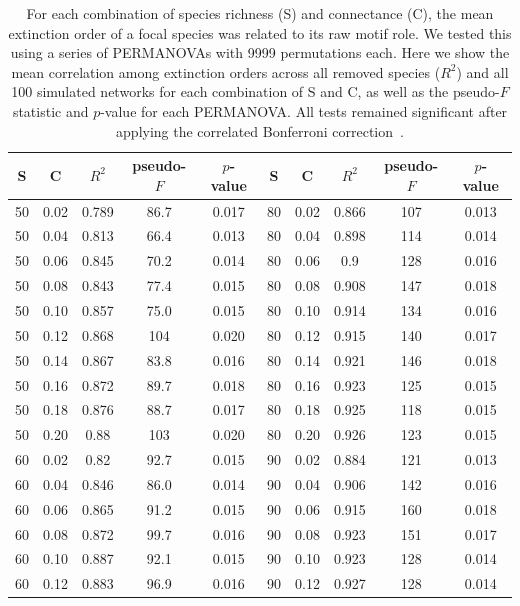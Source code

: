 \documentclass[12pt]{article}
\begin{document}
	\begin{table}[h!]
		\caption{For each combination of species richness (S) and connectance (C), the mean extinction order of a focal species was related to its raw motif role. We tested this using a series of PERMANOVAs with 9999 permutations each. Here we show the mean correlation among extinction orders across all removed species ($R^2$) and all 100 simulated networks for each combination of S and C, as well as the pseudo-$F$ statistic and $p$-value for each PERMANOVA. All tests remained significant after applying the correlated Bonferroni correction~\citep{Drezner2016}.}
		\label{permtable}
		\begin{tabular}{c c | c | c c ||c c | c | c c |}
			S	&	C	&	$R^2$	&	pseudo-$F$	&	$p$-value	&	S	&	C &	$R^2$	&	pseudo-$F$	&	$p$-value\\ 
			\hline
			50	&	0.02	&	0.789	&	86.7	&	0.017	&	80	&	0.02	&	0.866	&	107	&	0.013	\\
			50	&	0.04	&	0.813	&	66.4	&	0.013	&	80	&	0.04	&	0.898	&	114	&	0.014	\\
			50	&	0.06	&	0.845	&	70.2	&	0.014	&	80	&	0.06	&	0.9	&	128	&	0.016	\\  
			50	&	0.08	&	0.843	&	77.4	&	0.015	&	80	&	0.08	&	0.908	&	147	&	0.018	\\
			50	&	0.10	&	0.857	&	75.0	&	0.015	&	80	&	0.10	&	0.914	&	134	&	0.016	\\
			50	&	0.12	&	0.868	&	104	&	0.020	&	80	&	0.12	&	0.915	&	140	&	0.017	\\
			50	&	0.14	&	0.867	&	83.8	&	0.016	&	80	&	0.14	&	0.921	&	146	&	0.018	\\
			50	&	0.16	&	0.872	&	89.7	&	0.018	&	80	&	0.16	&	0.923	&	125	&	0.015	\\
			50	&	0.18	&	0.876	&	88.7	&	0.017	&	80	&	0.18	&	0.925	&	118	&	0.015	\\
			50	&	0.20	&	0.88	&	103	&	0.020	&	80	&	0.20	&	0.926	&	123	&	0.015	\\
			60	&	0.02	&	0.82	&	92.7	&	0.015	&	90	&	0.02	&	0.884	&	121	&	0.013	\\
			60	&	0.04	&	0.846	&	86.0	&	0.014	&	90	&	0.04	&	0.906	&	142	&	0.016	\\
			60	&	0.06	&	0.865	&	91.2	&	0.015	&	90	&	0.06	&	0.915	&	160	&	0.018	\\
			60	&	0.08	&	0.872	&	99.7	&	0.016	&	90	&	0.08	&	0.923	&	151	&	0.017	\\
			60	&	0.10	&	0.887	&	92.1	&	0.015	&	90	&	0.10	&	0.923	&	128	&	0.014	\\
			60	&	0.12	&	0.883	&	96.9	&	0.016	&	90	&	0.12	&	0.927	&	128	&	0.014	\\

\end{tabular}
\end{table}
\end{document}
